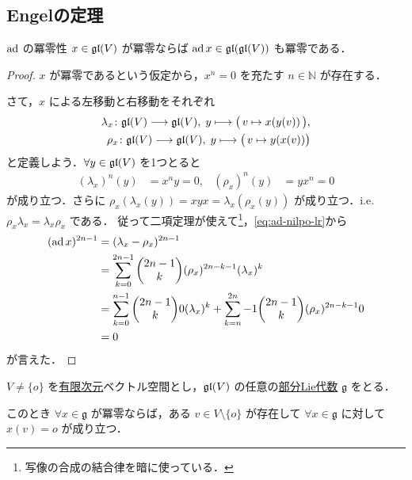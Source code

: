 \documentclass[rep_main]{subfiles}
\begin{document}
\subsection{Engelの定理}

\begin{mylem}[label=lem:ad-nilpo]{$\operatorname{ad}$ の冪零性}
    $x \in \mathfrak{gl} (V)$ が冪零ならば $\operatorname{ad} x \in \mathfrak{gl} (\mathfrak{gl} (V))$ も冪零である．
\end{mylem}

\begin{proof}
    $x$ が冪零であるという仮定から，$x^n = 0$ を充たす $n \in \mathbb{N}$ が存在する． 
    
    さて，$x$ による左移動と右移動をそれぞれ
    \begin{align}
        \lambda_x \colon \mathfrak{gl} (V) \longrightarrow \mathfrak{gl} (V),\; y \longmapsto \bigl(\, v \mapsto x (y(v))\,\bigr), \\
        \rho_x \colon \mathfrak{gl} (V) \longrightarrow \mathfrak{gl} (V),\; y \longmapsto \bigl(\, v \mapsto y(x(v)) \bigr)
    \end{align}
    と定義しよう．$\forall y \in \mathfrak{gl} (V)$ を1つとると
    \begin{align}
        \label{eq:ad-nilpo-lr}
        (\lambda_x)^n (y) &= x^n y = 0, &
        (\rho_x)^n (y) &= y x^n = 0
    \end{align}
    が成り立つ．さらに $\rho_x (\lambda_x (y)) = xyx = \lambda_x (\rho_x (y))$ が成り立つ．i.e. $\rho_x \lambda_x = \lambda_x \rho_x$ である．
    従って二項定理が使えて\footnote{写像の合成の結合律を暗に使っている．}，\eqref{eq:ad-nilpo-lr}から
    \begin{align}
        (\ad x)^{2n-1} &= (\lambda_x - \rho_x)^{2n-1} \\
        &= \sum_{k=0}^{2n-1} \mqty(2n-1 \\ k) (\rho_x)^{2n-k-1} (\lambda_x)^{k} \\ 
        &= \sum_{k=0}^{n-1} \mqty(2n-1 \\ k) 0 (\lambda_x)^k + \sum_{k=n}^{2n}-1 \mqty(2n-1 \\ k) (\rho_x)^{2n - k - 1} 0 \\
        &= 0
    \end{align}
    が言えた．
\end{proof}


\begin{mylem}[label=lem:eigen]{}
    $V \neq \{o\}$ を\underline{有限次元}ベクトル空間とし，$\mathfrak{gl} (V)$ の任意の\hyperref[def:subLieAlg]{部分Lie代数} $\mathfrak{g}$ をとる．

    このとき $\forall x \in \mathfrak{g}$ が冪零ならば，ある $v \in V \setminus \{o\}$ が存在して $\forall x \in \mathfrak{g}$ に対して $x(v) = o$ が成り立つ．
\end{mylem}
\end{document}

